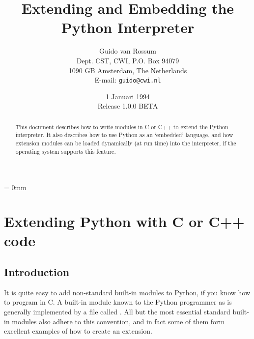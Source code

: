 
\title{\bf Extending and Embedding the Python Interpreter}

\author{
	Guido van Rossum \\
	Dept. CST, CWI, P.O. Box 94079 \\
	1090 GB Amsterdam, The Netherlands \\
	E-mail: {\tt guido@cwi.nl}
}

\date{1 Januari 1994 \\ Release 1.0.0 BETA} %

\makeindex




\maketitle

\begin{abstract}

\noindent
This document describes how to write modules in C or C++ to extend the
Python interpreter.  It also describes how to use Python as an
`embedded' language, and how extension modules can be loaded
dynamically (at run time) into the interpreter, if the operating
system supports this feature.

\end{abstract}

\pagebreak

{
\parskip = 0mm
\tableofcontents
}

\pagebreak



\chapter{Extending Python with C or C++ code}


\section{Introduction}

It is quite easy to add non-standard built-in modules to Python, if
you know how to program in C.  A built-in module known to the Python
programmer as  is generally implemented by a file called
.  All but the most essential standard built-in
modules also adhere to this convention, and in fact some of them form
excellent examples of how to create an extension.

